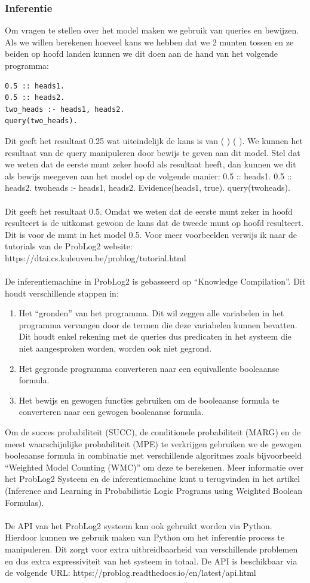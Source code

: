 \documentclass[12pt,a4paper,oneside]{book}
\theoremstyle{definition}
\begin{document}
\subsubsection{Inferentie}
\label{subsubsec:inferentieProbLog2}
Om vragen te stellen over het model maken we gebruik van queries en bewijzen. Als we willen berekenen hoeveel kans we hebben dat we 2 munten tossen en ze beiden op hoofd landen kunnen we dit doen aan de hand van het volgende programma:
\begin{lstlisting}
0.5 :: heads1.
0.5 :: heads2.
two_heads :- heads1, heads2.
query(two_heads).
\end{lstlisting}
Dit geeft het resultaat 0.25 wat uiteindelijk de kans is van ( ) ( ).
We kunnen het resultaat van de query manipuleren door bewijs te geven aan dit model. Stel dat we weten dat de eerste munt zeker hoofd als resultaat heeft, dan kunnen we dit als bewijs meegeven aan het model op de volgende manier:
0.5 :: heads1.
0.5 :: heads2.
two\textunderscore heads :- heads1, heads2.
Evidence(heads1, true).
query(two\textunderscore heads).
\\\\
Dit geeft het resultaat 0.5. Omdat we weten dat de eerste munt zeker in hoofd resulteert is de uitkomst gewoon de kans dat de tweede munt op hoofd resulteert. Dit is voor de munt in het model 0.5. Voor meer voorbeelden verwijs ik naar de tutorials van de ProbLog2 website: https://dtai.cs.kuleuven.be/problog/tutorial.html
\\\\
De inferentiemachine in ProbLog2 is gebasseerd op “Knowledge Compilation”. Dit houdt verschillende stappen in:
\begin{enumerate}
	\item Het “gronden” van het programma. Dit wil zeggen alle variabelen in het programma vervangen door de termen die deze variabelen kunnen bevatten. Dit houdt enkel rekening met de queries dus predicaten in het systeem die niet aangesproken worden, worden ook niet gegrond.
	\item Het gegronde programma converteren naar een equivallente booleaanse formula.
	\item Het bewijs en gewogen functies gebruiken om de booleaanse formula te converteren naar een gewogen booleaanse formula.
\end{enumerate}
Om de succes probabiliteit (SUCC), de conditionele probabiliteit (MARG) en de meest waarschijnlijke probabiliteit (MPE) te verkrijgen gebruiken we de gewogen booleaanse formula in combinatie met verschillende algoritmes zoals bijvoorbeeld “Weighted Model Counting (WMC)” om deze te berekenen. Meer informatie over het ProbLog2 Systeem en de inferentiemachine kunt u terugvinden in het artikel (Inference and Learning in Probabilistic Logic Programs using Weighted Boolean Formulas).
\\\\
De API van het ProbLog2 systeem kan ook gebruikt worden via Python. Hierdoor kunnen we gebruik maken van Python om het inferentie process te manipuleren. Dit zorgt voor extra uitbreidbaarheid van verschillende problemen en dus extra expressiviteit van het systeem in totaal. De API is beschikbaar via de volgende URL: https://problog.readthedocs.io/en/latest/api.html
\end{document}

